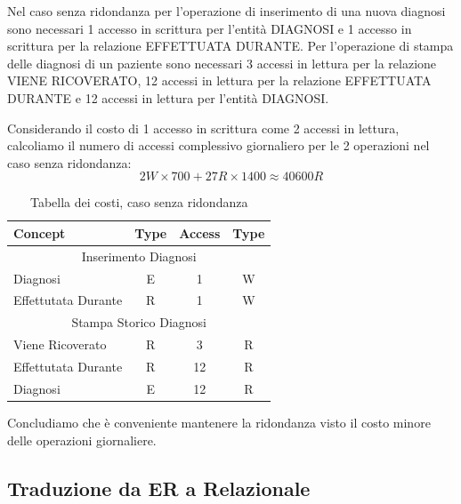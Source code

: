 \documentclass{article}
\begin{document}
Nel caso senza ridondanza per l'operazione di inserimento di una nuova diagnosi sono necessari 1 accesso in scrittura per l'entità DIAGNOSI e 1 accesso in scrittura per la relazione EFFETTUATA DURANTE.
Per l'operazione di stampa delle diagnosi di un paziente sono necessari 3 accessi in lettura per la relazione VIENE RICOVERATO, 12 accessi in lettura per la relazione EFFETTUATA DURANTE e 12 accessi in lettura per l'entità DIAGNOSI.

Considerando il costo di 1 accesso in scrittura come 2 accessi in lettura, calcoliamo il numero di accessi complessivo giornaliero per le 2 operazioni nel caso senza ridondanza:
\begin{equation}
	2W \times 700 + 27R \times 1400 \approx	40600R
\end{equation}

\begin{table}[H]
	\label{table:4}
	\centering
	\begin{tabular}{|l|c|c|c|}
		\hline
		\textbf{Concept}    & \textbf{Type} & \textbf{Access} & \textbf{Type} \\ \hline
		\multicolumn{4}{|c|}{Inserimento Diagnosi}                            \\ \hline
		Diagnosi            & E             & 1               & W             \\ \hline
		Effettutata Durante & R             & 1               & W             \\ \hline
		\multicolumn{4}{|c|}{Stampa Storico Diagnosi}                         \\ \hline
		Viene Ricoverato    & R             & 3               & R             \\ \hline
		Effettutata Durante & R             & 12              & R             \\ \hline
		Diagnosi            & E             & 12              & R             \\ \hline
	\end{tabular}
	\caption{Tabella dei costi, caso senza ridondanza}
\end{table}

Concludiamo che è conveniente mantenere la ridondanza visto il costo minore delle operazioni giornaliere.

\subsection{Traduzione da ER a Relazionale}
\end{document}
